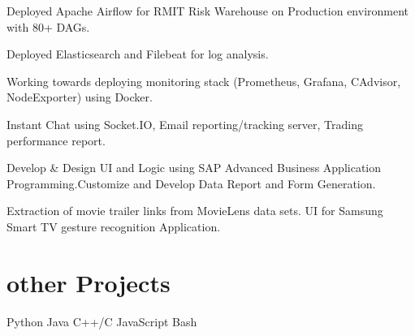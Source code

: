 \documentclass[]{Vishnu-Resume}
\begin{document}
\begin{minipage}[t]{0.66\textwidth}
\begin{tightemize}\item Deployed Apache Airflow for RMIT Risk Warehouse on Production environment with 80+ DAGs.
\item Deployed Elasticsearch and Filebeat for log analysis.
\item Working towards deploying monitoring stack (Prometheus, Grafana, CAdvisor, NodeExporter) using Docker.
\end{tightemize}
\sectionsep

\begin{tightemize}\item Instant Chat using Socket.IO, Email reporting/tracking server, Trading performance report.
\end{tightemize}
\sectionsep

\begin{tightemize}\item Develop \& Design UI and Logic using SAP Advanced Business Application
Programming.Customize and Develop Data Report and Form Generation.
\end{tightemize}
\sectionsep

\begin{tightemize}\item Extraction of movie trailer links from MovieLens data sets. UI for Samsung Smart TV gesture recognition Application.
\end{tightemize}
\sectionsep

\section{other Projects}
Python \textbullet{} Java \textbullet{} C++/C  \textbullet{} JavaScript \textbullet{} Bash

\end{minipage} 
\end{document}
